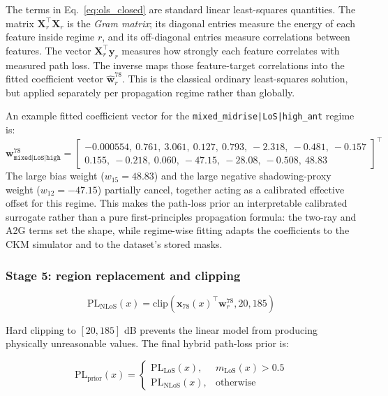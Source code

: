 The terms in Eq.~\eqref{eq:ols_closed} are standard linear least-squares
quantities. The matrix \(\textbf{X}_r^\top\textbf{X}_r\) is the
\emph{Gram matrix}; its diagonal entries measure the energy of each feature
inside regime \(r\), and its off-diagonal entries measure correlations between
features. The vector \(\textbf{X}_r^\top\textbf{y}_r\) measures how strongly
each feature correlates with measured path loss. The inverse maps those
feature-target correlations into the fitted coefficient vector
\(\hat{\textbf{w}}^{78}_{r}\). This is the classical ordinary least-squares
solution, but applied separately per propagation regime rather than globally.

An example fitted coefficient vector for the \texttt{mixed\_midrise|LoS|high\_ant}
regime is:
\[
\textbf{w}^{78}_{\texttt{mixed|LoS|high}}
=
\begin{bmatrix}
-0.000554,\ 0.761,\ 3.061,\ 0.127,\ 0.793,\ -2.318,\ -0.481,\ -0.157 \\[4pt]
0.155,\ -0.218,\ 0.060,\ -47.15,\ -28.08,\ -0.508,\ 48.83
\end{bmatrix}^\top
\]
The large bias weight ($w_{15} = 48.83$) and the large negative
shadowing-proxy weight ($w_{12} = -47.15$) partially cancel, together
acting as a calibrated effective offset for this regime.
This makes the path-loss prior an interpretable calibrated surrogate rather than a pure
first-principles propagation formula: the two-ray and A2G terms set the
shape, while regime-wise fitting adapts the coefficients to the CKM simulator
and to the dataset's stored masks.

\subsubsection{Stage 5: region replacement and clipping}

\begin{equation}
\mathrm{PL}_{\mathrm{NLoS}}(x)
=
\mathrm{clip}\!\left(
\textbf{x}_{78}(x)^\top \textbf{w}^{78}_{r},
20,
185
\right)
\label{eq:pl_nlos_final}
\end{equation}

Hard clipping to $[20, 185]$ dB prevents the linear model from producing
physically unreasonable values. The final hybrid path-loss prior is:

\begin{equation}
\mathrm{PL}_{\mathrm{prior}}(x)
=
\begin{cases}
\mathrm{PL}_{\mathrm{LoS}}(x), & m_{\mathrm{LoS}}(x) > 0.5 \\
\mathrm{PL}_{\mathrm{NLoS}}(x), & \text{otherwise}
\end{cases}
\label{eq:pl_hybrid}
\end{equation}


